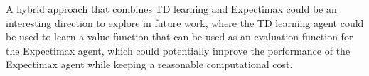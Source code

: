 \documentclass[letterpaper]{article} %
\begin{document}
    A hybrid approach that combines TD learning and Expectimax could be an interesting direction to explore in future work, 
    where the TD learning agent could be used to learn a value function that can be used as an evaluation function for the Expectimax agent,
    which could potentially improve the performance of the Expectimax agent while keeping a reasonable computational cost.



\end{document}
